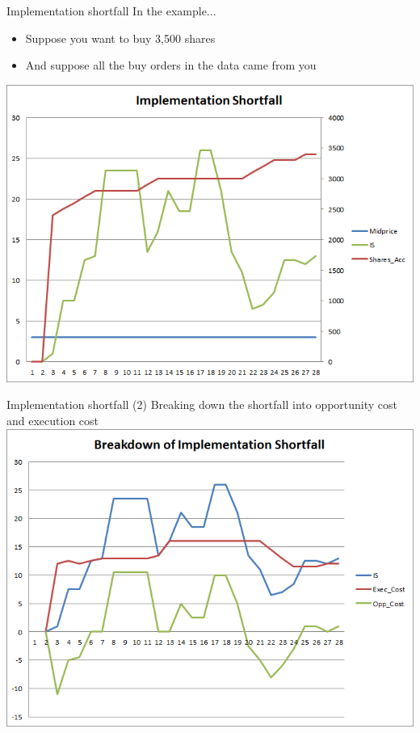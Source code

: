 \begin{frame}{Implementation shortfall}
	In the example... 
	\begin{itemize}
		\item Suppose you want to buy 3,500 shares
		\item And suppose all the buy orders in the data came from you
	\end{itemize}
	\center
	\includegraphics[scale=0.39]{pics/L2_is}
\end{frame}


\begin{frame}{Implementation shortfall (2)}
	Breaking down the shortfall into opportunity cost and execution cost
	\center
	\includegraphics[scale=0.39]{pics/L2_is2}
\end{frame}


